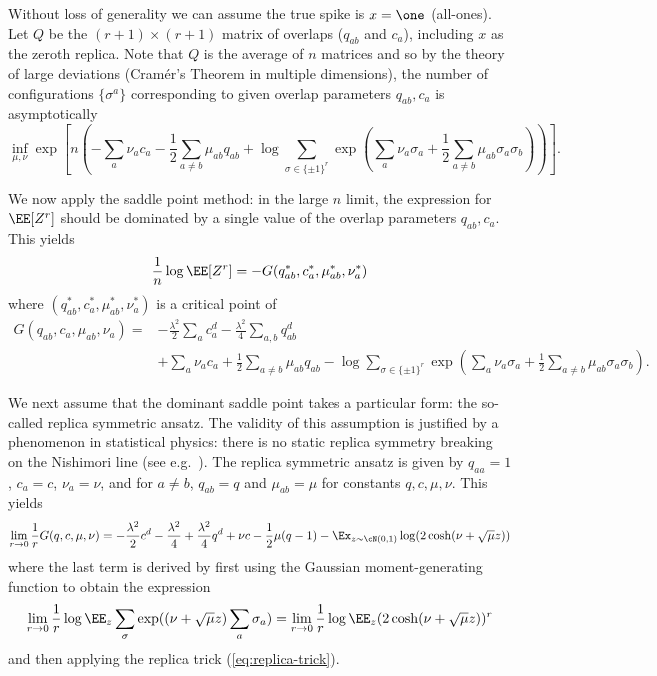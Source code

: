 \documentclass{article}
\begin{document}
Without loss of generality we can assume the true spike is $x = \one$ (all-ones). Let $Q$ be the $(r+1)\times (r+1)$ matrix of overlaps ($q_{ab}$ and $c_a$), including $x$ as the zeroth replica. Note that $Q$ is the average of $n$ \iid matrices and so by the theory of large deviations (Cram\'er's Theorem in multiple dimensions), the number of configurations $\{\sigma^a\}$ corresponding to given overlap parameters $q_{ab},c_a$ is asymptotically
\begin{equation}
\label{eq:rad-entropy}
\inf_{\mu,\nu} \exp\left[n\left(-\sum_a \nu_a c_a - \frac{1}{2} \sum_{a \ne b} \mu_{ab} q_{ab} + \log \sum_{\sigma \in \{\pm 1\}^r}\exp\left(\sum_a \nu_a \sigma_a + \frac{1}{2}\sum_{a \ne b} \mu_{ab} \sigma_a \sigma_b\right)\right)\right].
\end{equation}

We now apply the saddle point method: in the large $n$ limit, the expression for $\EE[Z^r]$ should be dominated by a single value of the overlap parameters $q_{ab},c_a$. This yields
$$\frac{1}{n} \log \EE[Z^r] = -G(q_{ab}^*,c_a^*,\mu_{ab}^*,\nu_a^*)$$
where $(q_{ab}^*,c_a^*,\mu_{ab}^*,\nu_a^*)$ is a critical point of
\begin{align*}
G(q_{ab},c_a,\mu_{ab},\nu_a) = &-\frac{\lambda^2}{2} \sum_a c_a^d - \frac{\lambda^2}{4} \sum_{a,b}  q_{ab}^d \\
&+ \sum_a \nu_a c_a + \frac{1}{2} \sum_{a \ne b} \mu_{ab} q_{ab} - \log \sum_{\sigma \in \{\pm 1\}^r}\exp\left(\sum_a \nu_a \sigma_a + \frac{1}{2}\sum_{a \ne b} \mu_{ab} \sigma_a \sigma_b\right).
\end{align*}

We next assume that the dominant saddle point takes a particular form: the so-called replica symmetric ansatz. The validity of this assumption is justified by a phenomenon in statistical physics: there is no static replica symmetry breaking on the Nishimori line (see e.g.\ \cite{statmech-survey}). The replica symmetric ansatz is given by $q_{aa} = 1$, $c_a = c$, $\nu_a = \nu$, and for $a \ne b$, $q_{ab} = q$ and $\mu_{ab} = \mu$ for constants $q,c,\mu,\nu$. This yields
$$\lim_{r \to 0} \frac{1}{r} G(q,c,\mu,\nu) = -\frac{\lambda^2}{2} c^d - \frac{\lambda^2}{4} + \frac{\lambda^2}{4} q^d + \nu c - \frac{1}{2} \mu(q-1) - \Ex_{z \sim \cN(0,1)} \log(2 \cosh(\nu + \sqrt{\mu} z))$$
where the last term is derived by first using the Gaussian moment-generating function to obtain the expression
$$\lim_{r \to 0} \frac{1}{r} \log \EE_z \sum_\sigma \exp((\nu + \sqrt{\mu} z)\sum_a \sigma_a) = \lim_{r \to 0} \frac{1}{r} \log \EE_z (2 \cosh(\nu + \sqrt{\mu}z))^r$$
and then applying the replica trick (\ref{eq:replica-trick}).
\end{document}
